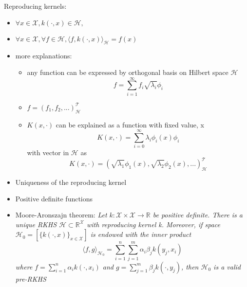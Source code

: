\documentclass[12pt, letterpaper]{article}
\begin{document}
Reproducing kernels:
\begin{itemize}
	\item $\forall x \in \mathcal{X}, k(\cdot, x) \in \mathcal{H},$
	\item $\forall x \in \mathcal{X}, \forall f \in \mathcal{H}, {\langle f, k(\cdot, x) \rangle}_{\mathcal{H}} = f(x)$
	\item more explanations:
	\begin{itemize}
		\item any function can be expressed by orthogonal basis on Hilbert space $\mathcal{H}$
		\begin{equation}
			f = \sum_{i=1}^{\infty} f_i \sqrt{\lambda_i} \phi_i
		\end{equation}
		\item $f = (f_1, f_2, ...)_{\mathcal{H}}^{\mathcal{T}}$
		\item $K(x,\cdot)$ can be explained as a function with fixed value, x
		\begin{equation}
			K(x,\cdot) = \sum_{i=0}^{\infty} {\lambda}_i \phi_i (x) \phi_i
		\end{equation}
		with vector in $\mathcal{H}$ as
		\begin{equation}
			K(x,\cdot) = (\sqrt{\lambda_1} \phi_1(x), \sqrt{\lambda_2} \phi_2 (x), ...)_{\mathcal{H}}^{\mathcal{T}}
		\end{equation}
	\end{itemize}
	\item Uniqueness of the reproducing kernel
	\item Positive definite functions
	\item Moore-Aronszajn theorem: 
	\textit{Let $k : \mathcal{X} \times \mathcal{X} \rightarrow \mathbb{R}$ be positive definite. There is a unique RKHS $\mathcal{H} \subset {\mathbb{R}}^{\mathcal{X}}$ with reproducing kernel k. Moreover, if space $\mathcal{H}_0 = [\{k(\cdot , x)\}_{x \in \mathcal{X}}]$ is endowed with the inner product}
	\begin{equation}
		{\langle f,g \rangle}_{\mathcal{H}_0} = \sum_{i=1}^n \sum_{j=1}^m \alpha_i \beta_j k(y_j, x_i)
	\end{equation}
	\textit{where $f=\sum_{i=1}^n \alpha_i k(\cdot, x_i)$ and $g=\sum_{j=1}^m \beta_j k(\cdot, y_j)$, then $\mathcal{H}_0$ is a valid pre-RKHS}
\end{itemize}
\end{document}
